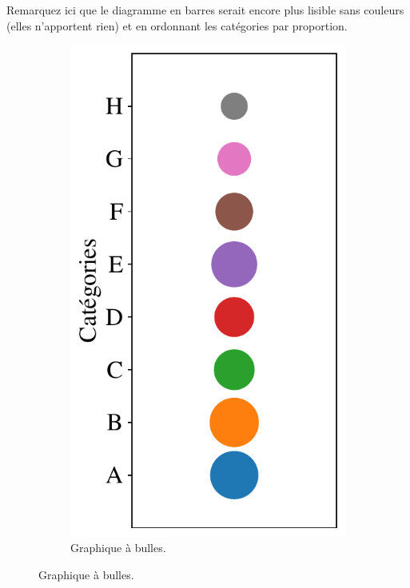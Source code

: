 Remarquez ici que le diagramme en barres serait encore plus lisible sans couleurs (elles n'apportent rien) et en ordonnant les catégories par proportion.
\begin{figure}[h]
  \centering
  \begin{subfigure}[t]{0.20\textwidth}
    \includegraphics[width=\textwidth]{figures/pratiques/areas_bubbles}  
    \caption{Graphique à bulles.}
    \label{fig:areas_bubbles}
  \end{subfigure}  \hfill

\end{figure}
